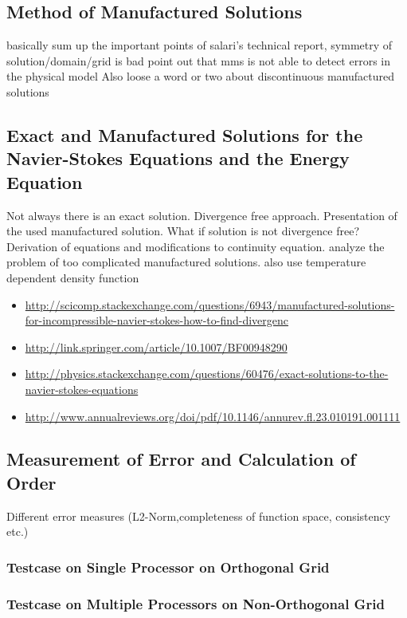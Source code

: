 \documentclass[article,type=msc,colorback,accentcolor=tud2a]{tudthesis}
\begin{document}
    \subsection{Method of Manufactured Solutions}
      basically sum up the important points of salari's technical report, symmetry of solution/domain/grid is bad
      point out that mms is not able to detect errors in the physical model
      Also loose a word or two about discontinuous manufactured solutions

    \subsection{Exact and Manufactured Solutions for the Navier-Stokes Equations and the Energy Equation}
    Not always there is an exact solution. Divergence free approach. Presentation of the used manufactured solution. What if solution is not divergence free? Derivation of equations and modifications to continuity equation. analyze the problem of too complicated manufactured solutions. also use temperature dependent density function
    \begin{itemize}
      \item \url{http://scicomp.stackexchange.com/questions/6943/manufactured-solutions-for-incompressible-navier-stokes-how-to-find-divergenc}
      \item \url{http://link.springer.com/article/10.1007/BF00948290}
      \item \url{http://physics.stackexchange.com/questions/60476/exact-solutions-to-the-navier-stokes-equations}
      \item \url{http://www.annualreviews.org/doi/pdf/10.1146/annurev.fl.23.010191.001111}
    \end{itemize}
    \subsection{Measurement of Error and Calculation of Order}
      Different error measures (L2-Norm,completeness of function space, consistency etc.)

      \subsubsection{Testcase on Single Processor on Orthogonal Grid}
      \subsubsection{Testcase on Multiple Processors on Non-Orthogonal Grid}
\end{document}
